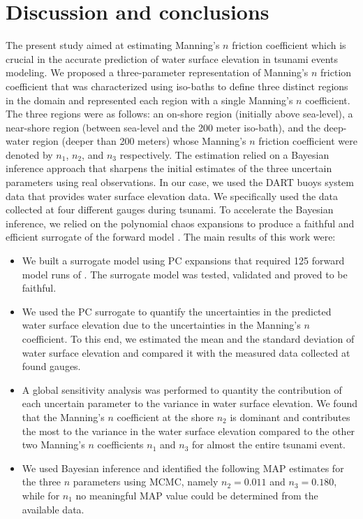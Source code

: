 \section{Discussion and conclusions}
\label{sec:conc}

The present study aimed at estimating Manning's $n$ friction coefficient 
which is crucial in the accurate prediction of water surface elevation in 
tsunami events modeling. We proposed a three-parameter representation
of Manning's $n$ friction coefficient that was characterized using iso-baths 
to define three distinct regions in the domain and represented each region
with a single Manning's $n$ coefficient. The three regions were as follows:
an on-shore region (initially above sea-level), a near-shore region (between
sea-level and the 200 meter iso-bath), and the deep-water region (deeper than
200 meters) whose Manning's $n$ friction coefficient were denoted by $n_1$, $n_2$, 
and $n_3$ respectively. The estimation relied on a Bayesian
inference approach that sharpens the initial estimates of the three uncertain parameters
using real observations. In our case, we used the DART buoys system data that provides water 
surface elevation data. We specifically used the data collected at four different gauges 
during \tohoku tsunami. To accelerate the Bayesian inference, we relied on the polynomial 
chaos expansions to produce a faithful and efficient surrogate of the forward model \geoclaw. 
The main results of this work were:
\begin{itemize}

\item We built a surrogate model using PC expansions that required 125 forward model runs of \geoclaw.
The surrogate model was tested, validated and proved to be faithful.

\item We used the PC surrogate to quantify the uncertainties in the predicted water surface elevation 
due to the uncertainties in the Manning's $n$ coefficient. To this end, we estimated the mean and the standard deviation of water surface elevation and compared it with the measured data collected at found gauges.

\item A global sensitivity analysis was performed to quantity the contribution of each uncertain parameter to the variance in water surface elevation.  We found that the Manning’s $n$ coefficient at the shore $n_2$ is dominant and
contributes the most to the variance in the water surface elevation compared
to the other two Manning’s $n$ coefficients $n_1$ and $n_3$ for almost the
entire tsunami event.

\item We used Bayesian inference and identified the following MAP
estimates for the three $n$ parameters using MCMC, namely $n_2=0.011$ and
$n_3=0.180$, while for $n_1$ no meaningful MAP value could be determined from the
available data.

\end{itemize}
 
